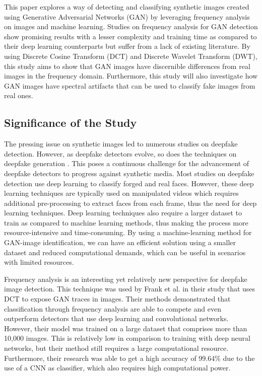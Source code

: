 \documentclass[journal]{./IEEE/IEEEtran}
\begin{document}
\par This paper explores a way of detecting and classifying synthetic images created using Generative Adversarial Networks (GAN) by leveraging frequency analysis on images and machine learning. Studies on frequency analysis for GAN detection show promising results with a lesser complexity and training time as compared to their deep learning counterparts but suffer from a lack of existing literature. By using Discrete Cosine Transform (DCT) and Discrete Wavelet Transform (DWT), this study aims to show that GAN images have discernible differences from real images in the frequency domain. Furthermore, this study will also investigate how GAN images have spectral artifacts that can be used to classify fake images from real ones. 

\subsection{Significance of the Study}

\par The pressing issue on synthetic images led to numerous studies on deepfake detection. However, as deepfake detectors evolve, so does the techniques on deepfake generation \cite{ml-conrad}. This poses a continuous challenge for the advancement of deepfake detectors to progress against synthetic media. Most studies on deepfake detection use deep learning to classify forged and real faces. However, these deep learning techniques are typically used on manipulated videos which requires additional pre-processing to extract faces from each frame, thus the need for deep learning techniques. Deep learning techniques also require a larger dataset to train as compared to machine learning methods\cite{mlvsdl}, thus making the process more resource-intensive and time-consuming. By using a machine-learning method for GAN-image identification, we can have an efficient solution using a smaller dataset and reduced computational demands, which can be useful in scenarios with limited resources. 

\par Frequency analysis is an interesting yet relatively new perspective for deepfake image detection. This technique was used by Frank et al. in their study  \cite{lev-freq-dct} that uses DCT to expose GAN traces in images. Their methods demonstrated that classification through frequency analysis are able to compete and even outperform detectors that use deep learning and convolutional networks. However, their model was trained on a large dataset that comprises more than 10,000 images. This is relatively low in comparison to training with deep neural networks, but their method still requires a large computational resource. Furthermore, their research was able to get a high accuracy of 99.64\% due to the use of a CNN as classifier, which also requires high computational power. 
\end{document}
